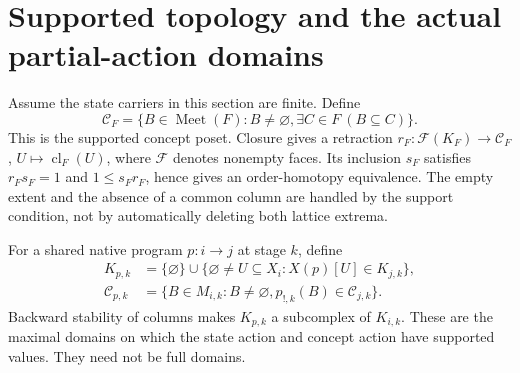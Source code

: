 \documentclass[11pt]{article}
\theoremstyle{remark}\newtheorem{remark}[theorem]{Remark}
\newcommand{\Meet}{\operatorname{Meet}}
\newcommand{\cl}{\operatorname{cl}}
\begin{document}
\section{Supported topology and the actual partial-action domains}
Assume the state carriers in this section are finite. Define
\[
 \mathcal C_F=\{B\in\Meet(F):B\ne\varnothing,
                     \exists C\in F\ (B\subseteq C)\}.
\]
This is the supported concept poset. Closure gives a retraction
$r_F:\mathcal F(K_F)\to\mathcal C_F$, $U\mapsto\cl_F(U)$,
where $\mathcal F$ denotes nonempty faces. Its inclusion $s_F$ satisfies
$r_Fs_F=1$ and $1\leq s_Fr_F$, hence gives an order-homotopy
equivalence. The empty extent and the absence of a common column are
handled by the support condition, not by automatically deleting both
lattice extrema.

For a shared native program $p:i\to j$ at stage $k$, define
\begin{align*}
 K_{p,k}&=\{\varnothing\}\cup
 \{\varnothing\ne U\subseteq X_i:X(p)[U]\in K_{j,k}\},\\
 \mathcal C_{p,k}&=\{B\in M_{i,k}:B\ne\varnothing,
                         p_{!,k}(B)\in\mathcal C_{j,k}\}.
\end{align*}
Backward stability of columns makes $K_{p,k}$ a subcomplex of $K_{i,k}$.
These are the maximal domains on which the state action and concept
action have supported values. They need not be full domains.
\end{document}
